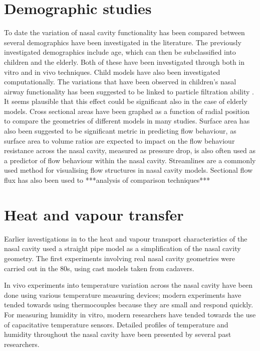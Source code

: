 \section{Demographic studies}
To date the variation of nasal cavity functionality has been compared between several demographics have been investigated in the literature. The previously investigated demographics include  age\cite{Xi2012}, which can then be subclassified into children\cite{Xi2012} and the elderly\cite{Lindemann2008}. Both of these have been investigated through both in vitro\cite{Weinhold2004} and in vivo\cite{Kalmovich2005, Edelstein1996, WhanKim2007, Lindemann2008} techniques. Child models have also been investigated computationally\cite{Xi2012}. The variations that have been observed in children's nasal airway functionality has been suggested to be linked to particle filtration ability \cite{Xi2012}. It seems plausible that this effect could be significant also in the case of elderly models. Cross sectional areas have been graphed as a function of radial position to compare the geometries of different models in many studies\cite{Xi2012, Zhu2011, Lindemann2008, Garcia2007}. Surface area has also been suggested to be significant metric in predicting flow behaviour, as surface area to volume ratios are expected to impact on the flow behaviour\cite{Xi2012, Garcia2007} resistance across the nasal cavity, measured as pressure drop, is also often used as a predictor of flow behaviour within the nasal cavity\cite{Edelstein1996, Lindemann2008, WhanKim2007}. Streamlines are a commonly used method for visualising flow structures in nasal cavity models\cite{Xi2012, Garcia2007, Zhu2011}. Sectional flow flux has also been used to 
***analysis of comparison techniques***


\section{Heat and vapour transfer}

Earlier investigations in to the heat and vapour transport characteristics of the nasal cavity used a straight pipe model as a simplification of the nasal cavity geometry\cite{Ingelstedt1961}. The first experiments involving real nasal cavity geometries were carried out in the 80s, using cast models taken from cadavers\cite{Nuckols1983}.

In vivo experiments into temperature variation across the nasal cavity have been done using various temperature measuring devices; modern experiments have tended towards using thermocouples because they are small and respond quickly\cite{Elad2008}. For measuring humidity in vitro, modern researchers have tended towards the use of capacitative temperature sensors\cite{Keck2000}. Detailed profiles of temperature and humidity throughout the nasal cavity have been presented by several past researchers\cite{Keck2000}.

